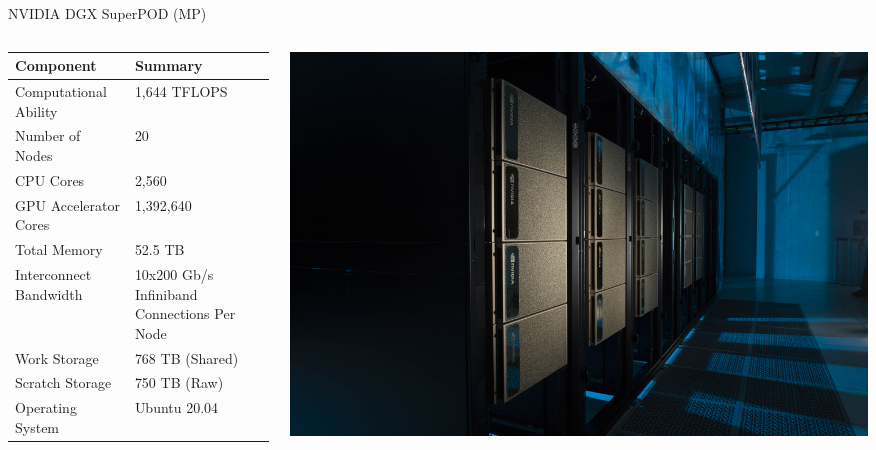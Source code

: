 \begin{frame}{NVIDIA DGX SuperPOD (MP)}
\begin{columns}
\begin{column}{0.5\textwidth}
\begin{table}
\tiny
\begin{tabular}{ll}
\toprule
Component & Summary \\
\midrule
Computational Ability & 1,644 TFLOPS \\
Number of Nodes & 20 \\
CPU Cores & 2,560 \\
GPU Accelerator Cores & 1,392,640 \\
Total Memory & 52.5 TB \\
Interconnect Bandwidth & 10x200 Gb/s Infiniband Connections Per Node \\
Work Storage & 768 TB (Shared) \\
Scratch Storage & 750 TB (Raw) \\
Operating System & Ubuntu 20.04 \\
\bottomrule
\end{tabular}
\end{table}
\end{column}
\begin{column}{0.5\textwidth}
\begin{center}
\includegraphics[width=\textwidth]{figures/superpod.jpg}
\end{center}
\end{column}
\end{columns}
\end{frame}

